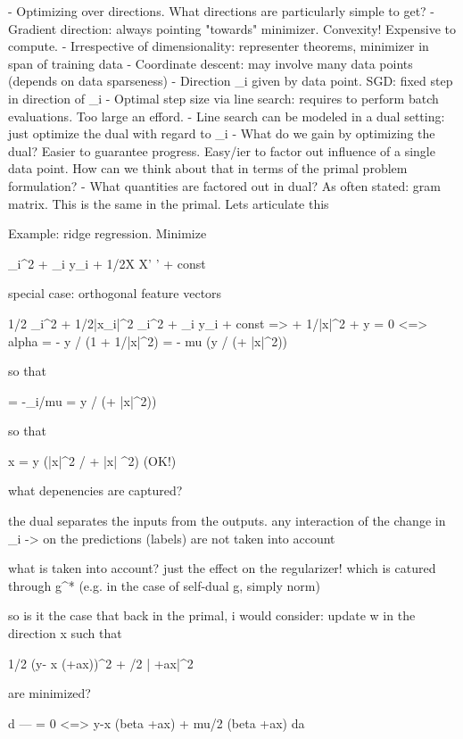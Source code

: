 - Optimizing over directions. What directions are particularly simple to get? 
- Gradient  direction: always pointing "towards" minimizer. Convexity! Expensive to compute.
- Irrespective of dimensionality: representer theorems, minimizer in span of training data 
- Coordinate descent: may involve many data points (depends on data sparseness)
- Direction \x_i  given by data point. SGD: fixed step in direction of \nabla \ell_i
- Optimal step size via line search: requires to perform batch evaluations. Too large an efford. 
- Line search can be modeled in a dual setting: just optimize the dual with regard to \alpha_i 
- What do we gain by optimizing the dual? Easier to guarantee progress. Easy/ier to factor out influence of a single data point. How can we think about that in terms of the primal problem formulation?
- What quantities are factored out in dual? As often stated: gram matrix. This is the same in the primal. Lets articulate this

Example: ridge regression. Minimize 

\alpha_i^2 + \alpha_i y_i   + 1/2\mu \alpha X X' \alpha' + const

special case: orthogonal feature vectors 

1/2 \alpha_i^2 + 1/2\mu |x_i|^2 \alpha_i^2 + \alpha_i y_i + const 
=> 
\alpha + 1/\mu |x|^2 \alpha + y = 0 
<=>
alpha = - y / (1 + 1/\mu |x|^2) = - mu (y / (\mu + |x|^2))

so that 

\beta  = -\alpha_i/mu = y /  (\mu + |x|^2))

so that 

x \beta = y (|x|^2 / \mu + |x| ^2) (OK!)

what depenencies are captured? 

the dual separates the inputs from the outputs. 
any interaction of the change in \alpha_i -> \beta on the predictions (labels) are not taken into account

what is taken into account?
just the effect on the regularizer! which is catured through g^* (e.g. in the case of self-dual g, simply norm)

so is it the case that back in the primal, i would consider:
update w in the direction x such that 

1/2 (y- x (\beta+ax))^2 + \mu/2 | \beta+ax|^2 

are minimized? 

d
--- = 0  <=> y-x (beta +ax) + mu/2 (beta +ax)
da



